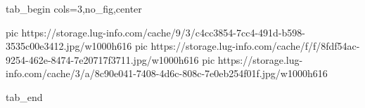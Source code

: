  
 
 
 
 


\ifcmt
  tab_begin cols=3,no_fig,center

     pic https://storage.lug-info.com/cache/9/3/c4cc3854-7cc4-491d-b598-3535c00e3412.jpg/w1000h616%
		 pic https://storage.lug-info.com/cache/f/f/8fdf54ac-9254-462e-8474-7e20717f3711.jpg/w1000h616%
		 pic https://storage.lug-info.com/cache/3/a/8c90e041-7408-4d6c-808c-7e0eb254f01f.jpg/w1000h616%

  tab_end
\fi
